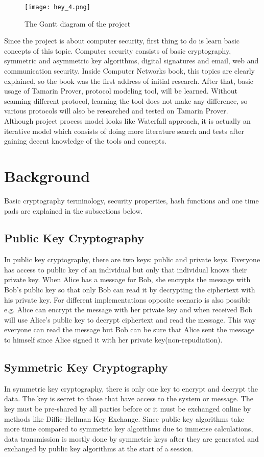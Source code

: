 \documentclass[a4paper, 12pt, titlepage]{article}
\begin{document}
\begin{figure}[H]
    \centering
    \texttt{[image: hey\_4.png]}
    \caption{The Gantt diagram of the project}
    \label{fig:ganttdiagram}
\end{figure}

Since the project is about computer security, first thing to do is learn basic concepts of this topic. Computer security consists of basic cryptography, symmetric and asymmetric key algorithms, digital signatures and email, web and communication security. Inside Computer Networks book\cite{tanenbaum}, this topics are clearly explained, so the book was the first address of initial research. After that, basic usage of Tamarin Prover, protocol modeling tool, will be learned. Without scanning different protocol, learning the tool does not make any difference, so various protocols will also be researched and tested on Tamarin Prover.
\bigskip
\\Although project process model looks like Waterfall approach, it is actually an iterative model which consists of doing more literature search and tests after gaining decent knowledge of the tools and concepts. 
\newpage
\section{Background}
Basic cryptography terminology, security properties, hash functions and one time pads are explained in the subsections below.
\subsection{Public Key Cryptography}
In public key cryptography, there are two keys: public and private keys. Everyone has access to public key of an individual but only that individual knows their private key. When Alice has a message for Bob, she encrypts the message with Bob’s public key so that only Bob can read it by decrypting the ciphertext with his private key. For different implementations opposite scenario is also possible e.g. Alice can encrypt the message with her private key and when received Bob will use Alice’s public key to decrypt ciphertext and read the message. This way everyone can read the message but Bob can be sure that Alice sent the message to himself since Alice signed it with her private key(non-repudiation).
\subsection{Symmetric Key Cryptography}
In symmetric key cryptography, there is only one key to encrypt and decrypt the data. The key is secret to those that have access to the system or message. The key must be pre-shared by all parties before or it must be exchanged online by methods like Diffie-Hellman Key Exchange. Since public key algorithms take more time compared to symmetric key algorithms due to immense calculations, data transmission is mostly done by symmetric keys after they are generated and exchanged by public key algorithms at the start of a session.
\end{document}
